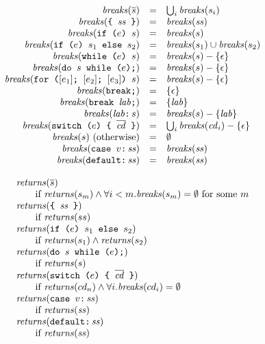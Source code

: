 \documentclass{article}
\newcommand{\seq}[1]{\overline{{#1}}}
\newcommand{\mathjs}[1]{\mbox{\texttt{{#1}}}}
\newcommand{\while}[2]{\mathjs{while (}{#1}\mathjs{) }{#2}}
\newcommand{\dowhile}[2]{\mathjs{do }{#1}\mathjs{ while (}{#2}\mathjs{);}}
\newcommand{\for}[4]{\mathjs{for (}{#1}\mathjs{; }{#2}\mathjs{; }{#3}\mathjs{) }{#4}}
\newcommand{\switch}[2]{\mathjs{switch (}{#1}\mathjs{) \char123{} }{#2}\mathjs{ \char125{}}}
\newcommand{\brk}{\mathjs{break;}}
\newcommand{\brkl}[1]{\mathjs{break }{#1}\mathjs{;}}
\newcommand{\lab}[2]{{#1}\mathjs{:}\,{#2}}
\newcommand{\ifone}[2]{\mathjs{if (}{#1}\mathjs{) }{#2}}
\newcommand{\iftwo}[3]{\mathjs{if (}{#1}\mathjs{) }{#2}\mathjs{ else }{#3}}
\newcommand{\block}[1]{\mathjs{\char123{} }{#1}\mathjs{ \char125{}}}
\newcommand{\returns}{\mathit{returns}}
\newcommand{\breaks}{\mathit{breaks}}
\begin{document}
\[
\begin{array}{rcl}
\breaks(\seq{s}) & = & \bigcup_i \breaks(s_i) \\
\breaks(\block{\mathit{ss}}) & = & \breaks(\mathit{ss}) \\
\breaks(\ifone{e}{s}) & = & \breaks(s) \\
\breaks(\iftwo{e}{s_1}{s_2}) & = & \breaks(s_1) \cup \breaks(s_2) \\
\breaks(\while{e}{s}) & = & \breaks(s) - \{ \epsilon \} \\
\breaks(\dowhile{s}{e}) & = & \breaks(s) - \{ \epsilon \} \\
\breaks(\for{[e_1]}{[e_2]}{[e_3]}{s}) & = & \breaks(s) - \{ \epsilon \} \\
\breaks(\brk) & = & \{ \epsilon \} \\
\breaks(\brkl{\mathit{lab}}) & = & \{ \mathit{lab} \} \\
\breaks(\lab{\mathit{lab}}{s}) & = & \breaks(s) - \{ \mathit{lab} \} \\
\breaks(\switch{e}{\seq{\mathit{cd}}}) & = & \bigcup_i \breaks(\mathit{cd}_i) - \{ \epsilon \} \\
\breaks(s) \mbox{ (otherwise)} & = & \emptyset \\
\breaks(\mathjs{case }v\mathjs{:}\,\mathit{ss}) & = & \breaks(\mathit{ss}) \\
\breaks(\mathjs{default:}\,\mathit{ss}) & = & \breaks(\mathit{ss}) \\
\end{array}
\]

\[
\begin{array}{l}
\returns(\seq{s}) \\
\qquad \mbox{if } \returns(s_m) \land \forall i < m . \breaks(s_m) = \emptyset \mbox{ for some } m \\
\returns(\block{\mathit{ss}}) \\
\qquad \mbox{if } \returns(ss) \\
\returns(\iftwo{e}{s_1}{s_2}) \\
\qquad \mbox{if } \returns(s_1) \land \returns(s_2) \\
\returns(\dowhile{s}{e}) \\
\qquad \mbox{if } \returns(s) \\
\returns(\switch{e}{\seq{\mathit{cd}}}) \\
\qquad \mbox{if } \returns(cd_n) \land \forall i . \breaks(cd_i) = \emptyset \\
\returns(\mathjs{case }v\mathjs{:}\,\mathit{ss}) \\
\qquad \mbox{if } \returns(\mathit{ss}) \\
\returns(\mathjs{default:}\,\mathit{ss}) \\
\qquad \mbox{if } \returns(\mathit{ss})
\end{array}
\]
\end{document}
